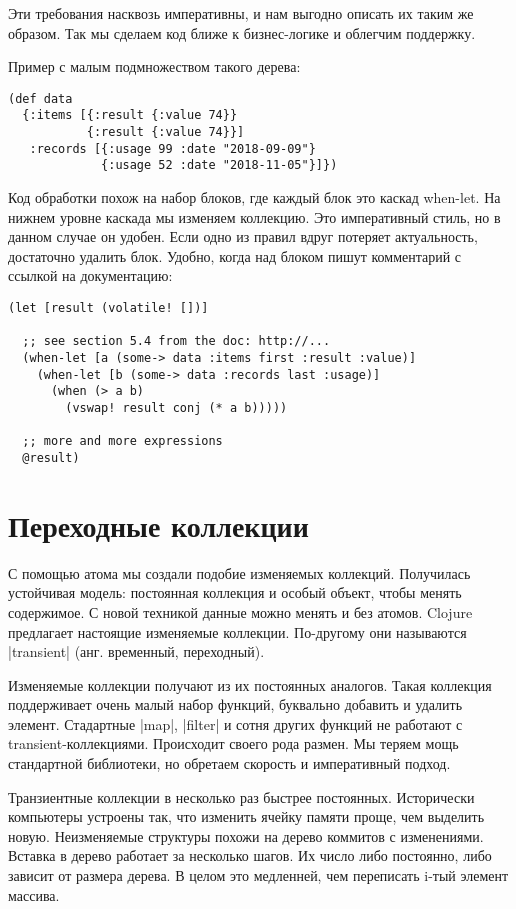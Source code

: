 Эти требования насквозь императивны, и нам выгодно описать их таким же
образом. Так мы сделаем код ближе к бизнес-логике и облегчим поддержку.

Пример с малым подмножеством такого дерева:

\begin{verbatim}
(def data
  {:items [{:result {:value 74}}
           {:result {:value 74}}]
   :records [{:usage 99 :date "2018-09-09"}
             {:usage 52 :date "2018-11-05"}]})
\end{verbatim}

Код обработки похож на набор блоков, где каждый блок это каскад when-let. На
нижнем уровне каскада мы изменяем коллекцию. Это императивный стиль, но в данном
случае он удобен. Если одно из правил вдруг потеряет актуальность, достаточно
удалить блок. Удобно, когда над блоком пишут комментарий с ссылкой на
документацию:

\begin{verbatim}
(let [result (volatile! [])]

  ;; see section 5.4 from the doc: http://...
  (when-let [a (some-> data :items first :result :value)]
    (when-let [b (some-> data :records last :usage)]
      (when (> a b)
        (vswap! result conj (* a b)))))

  ;; more and more expressions
  @result)
\end{verbatim}

\section{Переходные коллекции}

С помощью атома мы создали подобие изменяемых коллекций. Получилась устойчивая
модель: постоянная коллекция и особый объект, чтобы менять содержимое. С новой
техникой данные можно менять и без атомов. Clojure предлагает настоящие
изменяемые коллекции. По-другому они называются \spverb|transient| (анг. временный,
переходный).

Изменяемые коллекции получают из их постоянных аналогов. Такая коллекция
поддерживает очень малый набор функций, буквально добавить и удалить
элемент. Стадартные \spverb|map|, \spverb|filter| и сотня других функций не работают с
transient-коллекциями. Происходит своего рода размен. Мы теряем мощь стандартной
библиотеки, но обретаем скорость и императивный подход.

Транзиентные коллекции в несколько раз быстрее постоянных. Исторически
компьютеры устроены так, что изменить ячейку памяти проще, чем выделить
новую. Неизменяемые структуры похожи на дерево коммитов с изменениями. Вставка в
дерево работает за несколько шагов. Их число либо постоянно, либо зависит от
размера дерева. В целом это медленней, чем переписать i-тый элемент массива.

